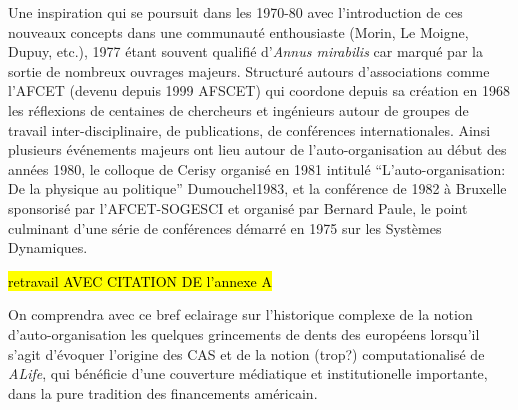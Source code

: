 Une inspiration qui se poursuit dans les 1970-80 avec l'introduction de ces nouveaux concepts dans une communauté enthousiaste (Morin, Le Moigne, Dupuy, etc.), 1977 étant souvent qualifié d'\textit{Annus mirabilis} car marqué par la sortie de nombreux ouvrages majeurs. Structuré autours d'associations comme l'AFCET (devenu depuis 1999 AFSCET) qui coordone depuis sa création en 1968 \autocite{Hoffsaes1990} les réflexions de centaines de chercheurs et ingénieurs autour de groupes de travail inter-disciplinaire, de publications, de conférences internationales. Ainsi plusieurs événements majeurs ont lieu autour de l'auto-organisation au début des années 1980, le colloque de Cerisy organisé en 1981 intitulé \enquote{L'auto-organisation: De la physique au politique} \autocite*[postnote]{key}{Dumouchel1983}, et la conférence de 1982 à Bruxelle sponsorisé par l'AFCET-SOGESCI et organisé par Bernard Paule, le point culminant d'une série de conférences démarré en 1975 sur les Systèmes Dynamiques.

\hl{retravail AVEC CITATION DE l'annexe A}

On comprendra avec ce bref eclairage sur l'historique complexe de la notion d'auto-organisation les quelques grincements de dents des européens \autocite{Varela1995} lorsqu'il s'agit d'évoquer l'origine des CAS et de la notion (trop?) computationalisé de \textit{ALife}, qui bénéficie d'une couverture médiatique et institutionelle importante, dans la pure tradition des financements américain. 



